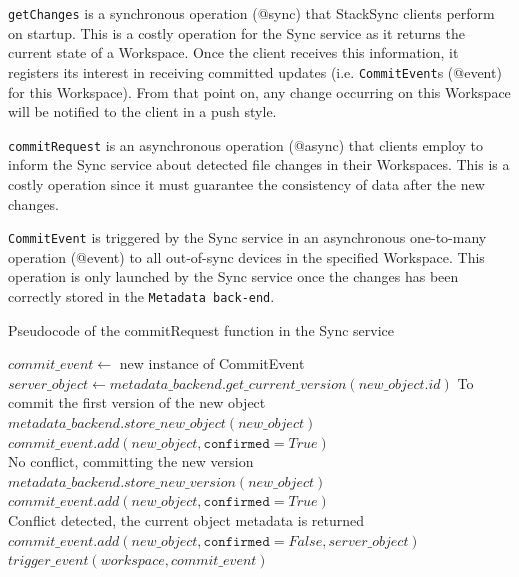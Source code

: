 \texttt{getChanges} is a synchronous operation (@sync) that StackSync clients perform on startup. This is a costly operation for the Sync service as it returns the current state of a Workspace. Once the client receives this information, it registers its interest in receiving committed updates (i.e. \texttt{CommitEvent}s (@event) for this Workspace). From that point on, any change occurring on this Workspace will be notified to the client in a push style.

\texttt{commitRequest} is an asynchronous operation (@async) that clients employ to inform the Sync service about detected file changes in their Workspaces.  This is a  costly operation since it must guarantee the consistency of data after the new changes. 

\texttt{CommitEvent} is triggered by the Sync service in an asynchronous one-to-many operation (@event) to all out-of-sync devices in the specified Workspace. This operation is only launched by the Sync service once the changes has been correctly stored in the \texttt{Metadata back-end}.

\begin{algorithm}[h]
  \caption{Pseudocode of the commitRequest function in the Sync service}
    \label{alg:commit_pseudocode}
  \begin{algorithmic}[1]
  	\footnotesize
      \State $commit\_event \gets $ new instance of CommitEvent
      	\State $server\_object \gets metadata\_backend.get\_current\_version(new\_object.id)$
          	\Comment To commit the first version of the new object
        	\State $metadata\_backend.store\_new\_object(new\_object)$
        	\State $commit\_event.add(new\_object, \mathtt{confirmed} = True)$
         	\\ \Comment No conflict, committing the new version
			\State $metadata\_backend.store\_new\_version(new\_object)$
			\State $commit\_event.add(new\_object, \mathtt{confirmed} =True)$
        \Else
        	\\
        	\Comment Conflict detected, the current object metadata is returned
        	\State $commit\_event.add(new\_object, \mathtt{confirmed} = False,  server\_object)$
        \EndIf
      \EndFor 
      \State $trigger\_event(workspace, commit\_event)$
    \EndFunction
  \end{algorithmic}
\end{algorithm}


